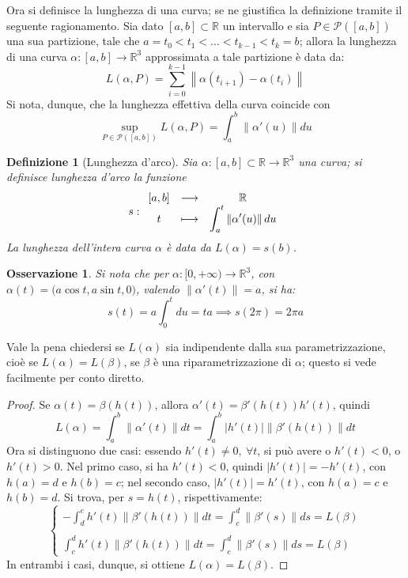 \documentclass[12pt]{scrartcl}
\theoremstyle{style}
\newtheorem{definizione}{Definizione}[section]
\newtheorem{osservazione}{Osservazione}[section]
\numberwithin{equation}{subsection}
\begin{document}
Ora si definisce la lunghezza di una curva; se ne giustifica la definizione tramite il seguente ragionamento.
Sia dato $[a,b] \subset \mathbb{R}$ un intervallo e sia $P \in \mathcal{P} ([a,b])$ una sua partizione, tale che $a = t_0 < t_1 < \ldots<t_{k-1} <t_k = b$; allora la lunghezza di una curva $\alpha  : [a,b] \to \mathbb{R}^3$ approssimata a tale partizione \`e data da:
\begin{equation}
	L(\alpha , P) = \sum_{i=0}^{k-1} \left\lVert \alpha (t_{i+1}) - \alpha (t_i) \right\rVert 
\end{equation}
Si nota, dunque, che la lunghezza effettiva della curva coincide con
\begin{equation}
	\sup_{P \in \mathcal{P}([a,b]) } L(\alpha ,P) = \int_{a} ^b \left\lVert \alpha' (u) \right\rVert du
\end{equation}
\begin{definizione}
	[Lunghezza d'arco]
	Sia $\alpha  : [a,b] \subset \mathbb{R}\to \mathbb{R}^3$ una curva; si definisce \textit{lunghezza d'arco} la funzione
	\[
	s :
	\begin{array}
		{c c c}
		[a,b] & \longrightarrow &\mathbb{R}\\
		t & \longmapsto &\displaystyle  \int_{a} ^t \left\lVert \alpha '(u) \right\rVert du
	\end{array}
	\] 
	La lunghezza dell'intera curva $\alpha $ \`e data da $L(\alpha ) = s(b)$.
\end{definizione}
\begin{osservazione}
Si nota che per $\alpha : [0,+\infty) \to \mathbb{R}^3$, con $\alpha  (t) = \big(a \cos t, a \sin t, 0\big)$, valendo $\left\lVert \alpha '(t) \right\rVert = a$, si ha:
\[
s(t) = a \int_{0} ^t du = ta \implies s (2\pi) = 2\pi a
\] 
\end{osservazione}
\noindent Vale la pena chiedersi se $L(\alpha )$ sia indipendente dalla sua parametrizzazione, cio\`e se $L(\alpha ) = L(\beta )$, se $\beta $ \`e una riparametrizzazione di $\alpha $; questo si vede facilmente per conto diretto.
\begin{proof}
	Se $\alpha (t) = \beta (h(t))$, allora $\alpha '(t) = \beta '(h(t)) h'(t)$, quindi
	\[
	L(\alpha ) = \int_{a} ^b \left\lVert \alpha '(t) \right\rVert dt = \int_{a} ^b \lvert h'(t) \rvert \left\lVert \beta '(h(t)) \right\rVert dt
	\] 
	Ora si distinguono due casi: essendo $h'(t)\neq 0, \ \forall t$, si pu\`o avere o $h'(t) <0$, o $h'(t) > 0$. 
	Nel primo caso, si ha $h'(t) < 0$, quindi $\lvert h'(t) \rvert = - h'(t)$, con $h(a) = d$ e $h(b) = c$; nel secondo caso, $\lvert h'(t) \rvert =h'(t)$, con $h(a) = c$ e $h(b) = d$.
	Si trova, per $s = h(t)$, rispettivamente:
	\[
	\begin{cases}
		\displaystyle -\int_{d} ^c h'(t) \left\lVert \beta '(h(t))  \right\rVert dt = \int_{c} ^d \left\lVert \beta '(s) \right\rVert ds = L(\beta )\\
		\\
		\displaystyle \int_{c} ^d h'(t) \left\lVert \beta '(h(t)) \right\rVert dt = \int_{c} ^d \left\lVert \beta '(s) \right\rVert ds = L(\beta )
	\end{cases}
	\] 
In entrambi i casi, dunque, si ottiene $L(\alpha ) = L(\beta )$.	
\end{proof}
\end{document}

